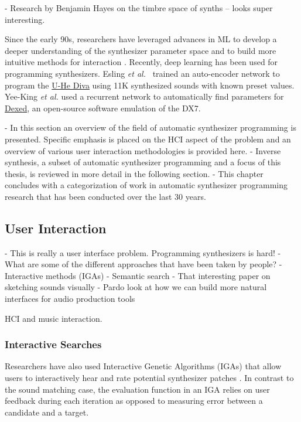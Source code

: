- Research by Benjamin Hayes on the timbre space of synths -- looks super interesting.

Since the early 90s, researchers have leveraged advances in ML to develop a deeper understanding of the synthesizer parameter space and to build more intuitive methods for interaction \cite{horner1993machine}. Recently, deep learning has been used for programming synthesizers.  Esling {\em et al.}\ \cite{esling2020flow} trained an auto-encoder network to program the \href{https://u-he.com/products/diva/}{U-He Diva} using 11K synthesized sounds with known preset values. Yee-King {\em et al.} \cite{yee2018automatic} used a recurrent network to automatically find parameters for \href{https://asb2m10.github.io/dexed/}{Dexed}, an open-source software emulation of the DX7.

- In this section an overview of the field of automatic synthesizer programming is presented. Specific emphasis is placed on the HCI aspect of the problem and an overview of various user interaction methodologies is provided here.
- Inverse synthesis, a subset of automatic synthesizer programming and a focus of this thesis, is reviewed in more detail in the following section.
- This chapter concludes with a categorization of work in automatic synthesizer programming research that has been conducted over the last 30 years.

\subsection{User Interaction}
- This is really a user interface problem. Programming synthesizers is hard!
- What are some of the different approaches that have been taken by people?
- Interactive methods (IGAs)
- Semantic search
- That interesting paper on sketching sounds visually
- Pardo look at how we can build more natural interfaces for audio production tools \cite{pardo2019learning} 

\cite{holland2013music} HCI and music interaction.

\subsubsection{Interactive Searches}
Researchers have also used Interactive Genetic Algorithms (IGAs) that allow users to interactively hear and rate potential synthesizer patches \cite{johnson1999exploring, dahlstedt2001creating, yee2016use}. In contrast to the sound matching case, the evaluation function in an IGA relies on user feedback during each iteration as opposed to measuring error between a candidate and a target. 


